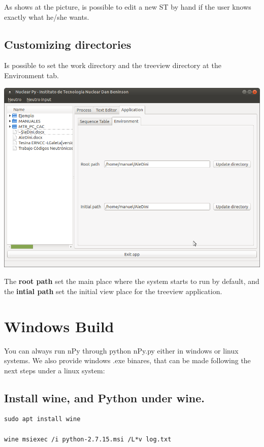 \documentclass[a4paper,10pt]{article}
\begin{document}
As shows at the picture, is possible to edit a new ST by hand if the user knows exactly what he/she wants.

\subsection{Customizing directories}

Is possible to set the work directory and the treeview directory at the Environment tab. 

 \begin{center}
 \includegraphics[width=\textwidth]{img/environment.png}
\end{center}

The \textbf{root path} set the main place where the system starts to run by default, and the \textbf{intial path} set the initial view place for the treeview application.

\section{Windows Build}

You can always run nPy through python nPy.py either in windows or linux systems. We also provide windows .exe binares, that can be made following the next steps under a linux system:

\subsection{Install wine, and Python under wine.}
\begin{verbatim}
sudo apt install wine

wine msiexec /i python-2.7.15.msi /L*v log.txt
\end{verbatim}
\end{document}
